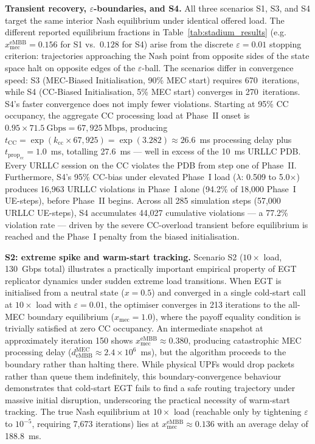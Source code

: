 \documentclass[conference]{IEEEtran}
\begin{document}
\textbf{Transient recovery, $\varepsilon$-boundaries, and S4.}
All three scenarios S1, S3, and S4 target the same interior Nash
equilibrium under identical offered load. The different reported
equilibrium fractions in Table~\ref{tab:stadium_results} (e.g.\
$x_\text{mec}^\text{eMBB} = 0.156$ for S1 vs.\ $0.128$ for S4)
arise from the discrete $\varepsilon = 0.01$ stopping criterion:
trajectories approaching the Nash point from opposite sides of
the state space halt on opposite edges of the $\varepsilon$-ball.
The scenarios differ in convergence speed: S3 (MEC-Biased
Initialisation, 90\% MEC start) requires 670~iterations, while
S4 (CC-Biased Initialisation, 5\% MEC start) converges in
270~iterations. S4's faster convergence does not imply fewer
violations. Starting at 95\% CC occupancy, the aggregate CC
processing load at Phase~II onset is $0.95 \times 71.5~\text{Gbps}
= 67{,}925~\text{Mbps}$, producing
$t_\text{CC} = \exp(k_\text{cc} \times 67{,}925)
= \exp(3.282) \approx 26.6$~ms processing delay plus
$t_{\text{prop}_\text{cc}} = 1.0$~ms, totalling 27.6~ms ---
well in excess of the 10~ms URLLC PDB. Every URLLC session on the
CC violates the PDB from step one of Phase~II.
Furthermore, S4's 95\% CC-bias under elevated Phase~I load
($\lambda$: 0.509 to 5.0$\times$) produces 16,963 URLLC violations
in Phase~I alone (94.2\% of 18,000 Phase~I UE-steps), before
Phase~II begins. Across all 285 simulation steps (57,000 URLLC
UE-steps), S4 accumulates 44,027 cumulative violations --- a
77.2\% violation rate --- driven by the severe CC-overload
transient before equilibrium is reached and the Phase~I penalty
from the biased initialisation.

\textbf{S2: extreme spike and warm-start tracking.}
Scenario S2 ($10\times$ load, 130~Gbps total) illustrates a
practically important empirical property of EGT replicator
dynamics under sudden extreme load transitions.
When EGT is initialised from a neutral state ($x = 0.5$) and
converged in a single cold-start call at $10\times$ load with
$\varepsilon = 0.01$, the optimiser converges in 213 iterations
to the all-MEC boundary equilibrium ($x_\text{mec} = 1.0$),
where the payoff equality condition is trivially satisfied at
zero CC occupancy. An intermediate snapshot at approximately
iteration 150 shows $x_\text{mec}^\text{eMBB} \approx 0.380$,
producing catastrophic MEC processing delay
($d_\text{eMBB}^\text{MEC} \approx 2.4\times10^6$~ms), but the
algorithm proceeds to the boundary rather than halting there.
While physical UPFs would drop packets rather than queue them
indefinitely, this boundary-convergence behaviour demonstrates
that cold-start EGT fails to find a safe routing trajectory
under massive initial disruption, underscoring the practical
necessity of warm-start tracking.
The true Nash equilibrium at $10\times$
load (reachable only by tightening $\varepsilon$ to $10^{-5}$,
requiring 7,673 iterations) lies at
$x_\text{mec}^\text{eMBB} \approx 0.136$ with an average
delay of 188.8~ms.
\end{document}
